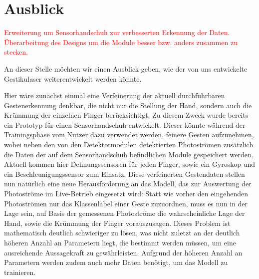 \chapter{Ausblick}
\label{ch:Ausblick}

\textcolor{red}{Erweiterung um Sensorhandschuh zur verbesserten Erkennung der Daten. Überarbeitung des Designs um die Module besser bzw. anders zusammen zu stecken.}

An dieser Stelle möchten wir einen Ausblick geben, wie der von uns entwickelte Gestikulaser  weiterentwickelt werden könnte. 

Hier wäre zunächst einmal eine Verfeinerung der aktuell durchführbaren Gestenerkennung denkbar, die nicht nur die Stellung der Hand, sondern auch die Krümmung der einzelnen Finger berücksichtigt. Zu diesem Zweck wurde bereits ein Prototyp für einen Sensorhandschuh entwickelt. Dieser könnte während der Trainingsphase vom Nutzer dazu verwendet werden, feinere Gesten aufzunehmen, wobei neben den von den Detektormodulen detektierten Photoströmen zusätzlich die Daten der auf dem Sensorhandschuh befindlichen Module gespeichert werden. Aktuell kommen hier Dehnungssensoren für jeden Finger, sowie ein Gyroskop und ein Beschleunigungssensor zum Einsatz. Diese verfeinerten Gestendaten stellen nun natürlich eine neue Herausforderung an das Modell, das zur Auswertung der Photoströme im Live-Betrieb eingesetzt wird: Statt wie vorher den eingehenden Photoströmen nur das Klassenlabel einer Geste zuzuordnen, muss es nun in der Lage sein, auf Basis der gemessenen Photoströme die wahrscheinliche Lage der Hand, sowie die Krümmung der Finger vorauszusagen. Dieses Problem ist mathematisch deutlich schwieriger zu lösen, was nicht zuletzt an der deutlich höheren Anzahl an Parametern liegt, die bestimmt werden müssen, um eine ausreichende Aussagekraft zu gewährleisten. Aufgrund der höheren Anzahl an Parametern werden zudem auch mehr Daten benötigt, um das Modell zu trainieren.